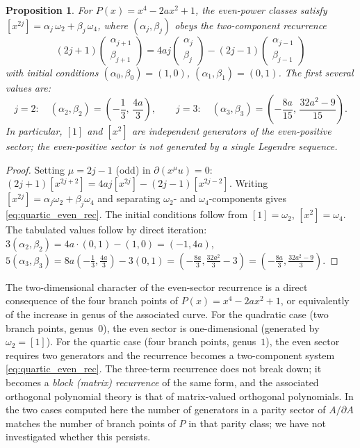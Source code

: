 \documentclass[11pt]{amsart}
\newtheorem{proposition}[theorem]{Proposition}
\theoremstyle{definition}
\theoremstyle{remark}
\newcommand{\pa}{\partial}
\begin{document}
\begin{proposition}\label{prop:quartic_even}
For $P(x) = x^4-2ax^2+1$, the even-power classes satisfy
$[x^{2j}] = \alpha_j\,\omega_2 + \beta_j\,\omega_4$, where
$(\alpha_j,\beta_j)$ obeys the two-component recurrence
\begin{equation}\label{eq:quartic_even_rec}
  (2j+1)\begin{pmatrix}\alpha_{j+1}\\\beta_{j+1}\end{pmatrix}
  = 4aj\begin{pmatrix}\alpha_j\\\beta_j\end{pmatrix}
  - (2j-1)\begin{pmatrix}\alpha_{j-1}\\\beta_{j-1}\end{pmatrix}
\end{equation}
with initial conditions $(\alpha_0,\beta_0) = (1,0)$,
$(\alpha_1,\beta_1) = (0,1)$.
The first several values are:
\[
  j=2{:}\quad (\alpha_2,\beta_2)=(-{\textstyle\frac{1}{3}},\,\frac{4a}{3}),\qquad
  j=3{:}\quad (\alpha_3,\beta_3)=(-{\textstyle\frac{8a}{15}},\,\frac{32a^2-9}{15}).
\]
In particular, $[1]$ and $[x^2]$ are \emph{independent} generators of the
even-positive sector; the even-positive sector is \emph{not} generated
by a single Legendre sequence.
\end{proposition}

\begin{proof}
Setting $\mu = 2j-1$ (odd) in $\pa(x^\mu u)=0$:
$(2j+1)[x^{2j+2}] = 4aj[x^{2j}] - (2j-1)[x^{2j-2}]$.
Writing $[x^{2j}] = \alpha_j\omega_2+\beta_j\omega_4$ and separating
$\omega_2$- and $\omega_4$-components gives \eqref{eq:quartic_even_rec}.
The initial conditions follow from $[1]=\omega_2$, $[x^2]=\omega_4$.
The tabulated values follow by direct iteration:
$3(\alpha_2,\beta_2) = 4a\cdot(0,1)-(1,0) = (-1,4a)$,
$5(\alpha_3,\beta_3) = 8a(-\tfrac{1}{3},\tfrac{4a}{3})
  - 3(0,1) = (-\tfrac{8a}{3},\tfrac{32a^2}{3}-3) = (-\tfrac{8a}{3},\tfrac{32a^2-9}{3})$. \qedhere
\end{proof}

The two-dimensional character of the even-sector recurrence is a
direct consequence of the four branch points of $P(x) = x^4-2ax^2+1$,
or equivalently of the increase in genus of the associated curve.
For the quadratic case (two branch points, genus~$0$), the even sector
is one-dimensional (generated by $\omega_2 = [1]$).
For the quartic case (four branch points, genus~$1$), the even sector
requires two generators and the recurrence becomes a two-component
system \eqref{eq:quartic_even_rec}.
The three-term recurrence does not break down; it becomes a
\emph{block (matrix) recurrence} of the same form, and the associated
orthogonal polynomial theory is that of matrix-valued orthogonal polynomials.
In the two cases computed here the number of generators in a parity sector of
$A/\pa A$ matches the number of branch points of $P$ in that parity class; we
have not investigated whether this persists.
\end{document}
